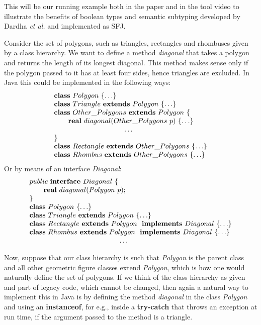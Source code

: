 \documentclass[runningheads]{llncs}
\begin{document}
\begin{example}[Polygons]
\label{polygons}
This will be our running example both in the paper and in the tool video \cite{UD20} to illustrate the benefits of boolean types and semantic subtyping developed by Dardha \emph{et al.} \cite{Dardha2013,Dardha2017} and implemented as SFJ.

Consider the set of polygons, such as triangles, rectangles and rhombuses given by a class hierarchy.
We want to define a method \emph{diagonal} that takes a polygon and returns the length of its longest diagonal. This method makes sense only if the polygon passed to it has at least four sides, hence triangles are excluded.
In Java this could be implemented in the following ways:
$$
\begin{array}{l}
\synclass Polygon \ \{ \ldots\}
\\
\syndecl{Triangle}{Polygon} {\ldots}
\\
\syndecl{Other\_Polygons}{Polygon} {
\\
	\qquad \mathbf{real}\ diagonal(Other\_Polygons \ p)\ \{\ldots \}
	\\
	\hspace{3.5cm} \ldots
	\\
}
\\
\syndecl{Rectangle}{Other\_Polygons}{\ldots}
\\
\syndecl{Rhombus}{Other\_Polygons} {\ldots}
\end{array}
$$
Or by means of an interface \emph{Diagonal}:
$$
\begin{array}{l}
public \ \syninterface Diagonal\ \{
	\\
	\qquad \mathbf{real}\ diagonal(Polygon \ p);
	\\
\}
\\
\synclass Polygon \ \{\ldots\}
\\
\syndecl{Triangle}{Polygon} {\ldots}
\\
\synidecl{Rectangle}{Polygon} \synimpl Diagonal \ \{\ldots\}
\\
\synidecl{Rhombus}{Polygon} \synimpl Diagonal \ \{\ldots\}
\\
\hspace{4.5cm} \ldots
\end{array}
$$

Now, suppose that our class hierarchy is such that \emph{Polygon} is the parent class and all other geometric figure classes extend \emph{Polygon}, which is how one would naturally define the set of polygons.
If we think of the class hierarchy as given and part of legacy code, which cannot be changed, then again a natural way to implement this in Java is by defining the method \emph{diagonal} in the class \emph{Polygon} and using an \textbf{instanceof}, for e.g., inside a \textbf{try-catch} that throws an exception at run time, if the argument passed to the method is a triangle.


\end{example}
\end{document}
